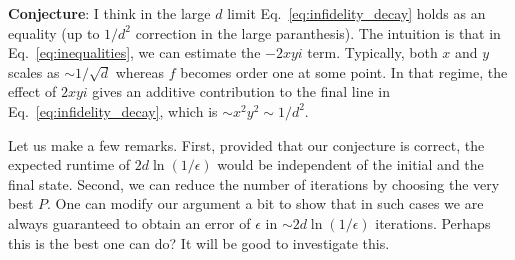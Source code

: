\documentclass[11pt]{article}
\begin{document}
\textbf{Conjecture}: I think in the large $d$ limit Eq.~\eqref{eq:infidelity_decay} holds as an equality (up to $1/d^2$ correction in the large paranthesis). The intuition is that in Eq.~\eqref{eq:inequalities}, we can estimate the $-2xyi$ term. Typically, both $x$ and $y$ scales as $\sim 1/\sqrt{d}$ whereas $f$ becomes order one at some point. In that regime, the effect of $2xyi$ gives an additive contribution to the final line in Eq.~\eqref{eq:infidelity_decay}, which is $\sim x^2y^2\sim 1/d^2$.


Let us make a few remarks. First, provided that our conjecture is correct, the expected runtime of $2d\ln (1/\epsilon)$ would be independent of the initial and the final state. Second, we can reduce the number of iterations by choosing the very best $P$. One can modify our argument a bit to show that in such cases we are always guaranteed to obtain an error of $\epsilon$ in $\sim 2d\ln(1/\epsilon)$ iterations. Perhaps this is the best one can do? It will be good to investigate this.



\end{document}
